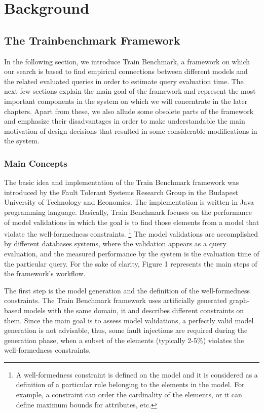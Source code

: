 
\chapter{Background}\label{chapter:background}

\section{The Trainbenchmark Framework}\label{section:trainbenchmark}

In the following section, we introduce Train Benchmark, a framework on which our search is based to find empirical connections between
different models and the related evaluated queries in order to estimate query evaluation time. The next few sections explain the main goal of the framework and represent the most important components in the system on which we will concentrate in the later chapters. Apart from these, we also allude some obsolete parts of the framework and emphasize their disadvantages in order to make understandable the main motivation of design decisions that resulted in some considerable modifications in the system.

\subsection{Main Concepts}

The basic idea and implementation of the Train Benchmark framework was introduced by the Fault Tolerant Systems Research Group in the Budapest
University of Technology and Economics. The implementation is written in Java programming language. Basically, Train Benchmark focuses on the performance of model validations in which the goal is to find those elements from a model that violate the well-formedness constraints. \footnote{A well-formedness constraint is defined on the model and it is considered as a definition of a particular rule belonging to the elements in the model. For example, a constraint can order the cardinality of the elements, or it can define maximum bounds for attributes, etc.} The model validations are accomplished by different databases systems, where the validation appears as a query evaluation, and the measured performance by the system is the evaluation time of the particular query. For the sake of clarity, Figure 1 represents the main steps of the framework's workflow.

The first step is the model generation and the definition of the well-formedness constraints. The Train Benchmark framework uses artificially generated graph-based models with the same domain, it and describes different constraints on them. Since the main goal is to assess model validations, a perfectly valid model generation is not advisable, thus, some fault injections are required during the generation phase, when a subset of the elements (typically 2-5\%) violates the well-formedness constraints. 

